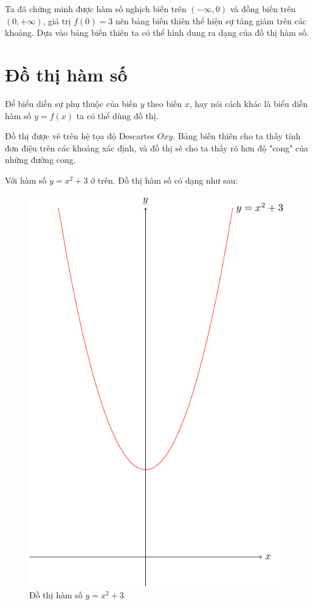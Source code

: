 Ta đã chứng minh được hàm số nghịch biến trên $(-\infty, 0)$
và đồng biến trên $(0, +\infty)$, giá trị $f(0) = 3$ nên bảng
biến thiên thể hiện sự tăng giảm trên các khoảng. Dựa vào 
bảng biến thiên ta có thể hình dung ra dạng của đồ thị hàm số.

\section{Đồ thị hàm số}

Để biểu diễn sự phụ thuộc của biến $y$ theo biến $x$, hay 
nói cách khác là biểu diễn hàm số $y=f(x)$ ta có thể dùng đồ thị.

Đồ thị được vẽ trên hệ tọa độ Descartes $Oxy$. Bảng biến thiên
cho ta thấy tính đơn điệu trên các khoảng xác định, và đồ thị
sẽ cho ta thấy rõ hơn độ "cong" của những đường cong.

\begin{example}
    Với hàm số $y = x^2 + 3$ ở trên. Đồ thị hàm số có dạng như sau:
    \begin{figure}[bh]
        \centering
        \includegraphics[scale=0.75]{pics/algebra/algebra2.pdf}
        \caption{Đồ thị hàm số $y=x^2 + 3$}
    \end{figure}
\end{example}

